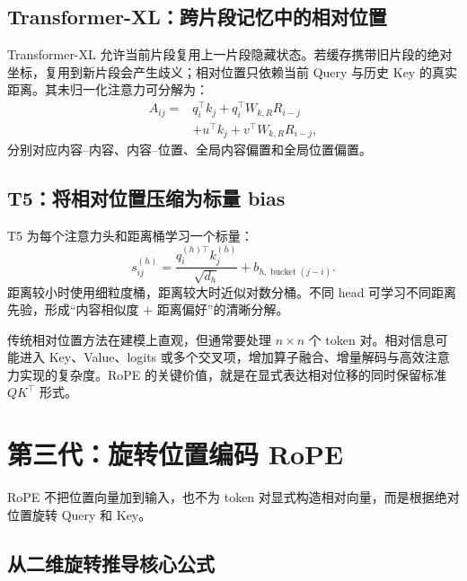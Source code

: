 \documentclass[UTF8,fontset=none,a4paper,10pt]{ctexart}
\begin{document}
\subsection{Transformer-XL：跨片段记忆中的相对位置}

Transformer-XL 允许当前片段复用上一片段隐藏状态\cite{dai2019}。若缓存携带旧片段的绝对坐标，复用到新片段会产生歧义；相对位置只依赖当前 Query 与历史 Key 的真实距离。其未归一化注意力可分解为：
\begin{equation}
  \begin{aligned}
  A_{ij}={}&q_i^\top k_j+q_i^\top W_{k,R}R_{i-j}\\
           &+u^\top k_j+v^\top W_{k,R}R_{i-j},
  \end{aligned}
  \label{eq:txl}
\end{equation}
分别对应内容--内容、内容--位置、全局内容偏置和全局位置偏置。

\subsection{T5：将相对位置压缩为标量 bias}

T5 为每个注意力头和距离桶学习一个标量\cite{raffel2020}：
\begin{equation}
  s_{ij}^{(h)}=
  \frac{q_i^{(h)\top}k_j^{(h)}}{\sqrt{d_h}}
  +b_{h,\operatorname{bucket}(j-i)}.
  \label{eq:t5-bias}
\end{equation}
距离较小时使用细粒度桶，距离较大时近似对数分桶。不同 head 可学习不同距离先验，形成“内容相似度 $+$ 距离偏好”的清晰分解。

传统相对位置方法在建模上直观，但通常要处理 $n\times n$ 个 token 对。相对信息可能进入 Key、Value、logits 或多个交叉项，增加算子融合、增量解码与高效注意力实现的复杂度。RoPE 的关键价值，就是在显式表达相对位移的同时保留标准 $QK^\top$ 形式。

\section{第三代：旋转位置编码 RoPE}

RoPE 不把位置向量加到输入，也不为 token 对显式构造相对向量，而是根据绝对位置旋转 Query 和 Key\cite{su2021}。

\subsection{从二维旋转推导核心公式}
\end{document}
